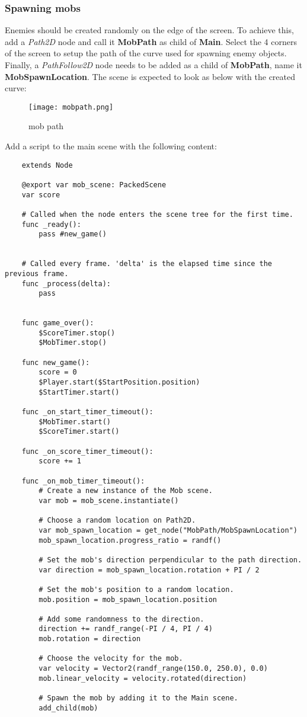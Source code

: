 \subsubsection{Spawning mobs}
Enemies should be created randomly on the edge of the screen. To achieve this, add a \textit{Path2D} node and call it
\textbf{MobPath} as child of \textbf{Main}. Select the 4 corners of the screen to setup the path of the curve used
for spawning enemy objects. Finally, a \textit{PathFollow2D} node needs to be added as a child of \textbf{MobPath},
name it \textbf{MobSpawnLocation}. The scene is expected to look as below with the created curve:
\begin{figure}[H]
    \centering
    \texttt{[image: mobpath.png]}
    \caption{mob path}
    \label{fig:mobpath}
\end{figure}
Add a script to the main scene with the following content:
\begin{verbatim}
    extends Node

    @export var mob_scene: PackedScene
    var score
    
    # Called when the node enters the scene tree for the first time.
    func _ready():
        pass #new_game()
    
    
    # Called every frame. 'delta' is the elapsed time since the previous frame.
    func _process(delta):
        pass
    
    
    func game_over():
        $ScoreTimer.stop()
        $MobTimer.stop()
        
    func new_game():
        score = 0
        $Player.start($StartPosition.position)
        $StartTimer.start()
    
    func _on_start_timer_timeout():
        $MobTimer.start()
        $ScoreTimer.start()
    
    func _on_score_timer_timeout():
        score += 1
    
    func _on_mob_timer_timeout():
        # Create a new instance of the Mob scene.
        var mob = mob_scene.instantiate()
    
        # Choose a random location on Path2D.
        var mob_spawn_location = get_node("MobPath/MobSpawnLocation")
        mob_spawn_location.progress_ratio = randf()
    
        # Set the mob's direction perpendicular to the path direction.
        var direction = mob_spawn_location.rotation + PI / 2
    
        # Set the mob's position to a random location.
        mob.position = mob_spawn_location.position
    
        # Add some randomness to the direction.
        direction += randf_range(-PI / 4, PI / 4)
        mob.rotation = direction
    
        # Choose the velocity for the mob.
        var velocity = Vector2(randf_range(150.0, 250.0), 0.0)
        mob.linear_velocity = velocity.rotated(direction)
    
        # Spawn the mob by adding it to the Main scene.
        add_child(mob)
\end{verbatim}
